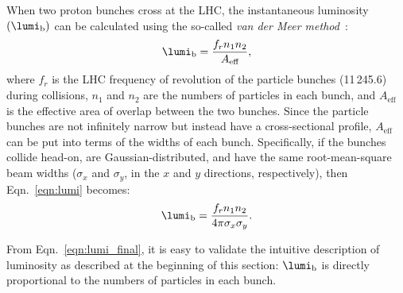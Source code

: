When two proton bunches cross at the LHC, the instantaneous luminosity $\left( \lumi_\text{b}\right)$ can be calculated using the so-called \emph{van der Meer method}~\cite{LUM_17_003}:
\begin{equation}
    \lumi_\text{b} = \frac{f_r  n_1  n_2}{A_\text{eff}},
    \label{eqn:lumi}
\end{equation}
where $f_r$ is the LHC frequency of revolution of the particle bunches (11\,245.6\Hz) during collisions,
$n_1$ and $n_2$ are the numbers of particles in each bunch,
and $A_\text{eff}$ is the effective area of overlap between the two bunches.
Since the particle bunches are not infinitely narrow but instead have a cross-sectional profile, $A_\text{eff}$ can be put into terms of the widths of each bunch.
Specifically, if the bunches collide head-on, are Gaussian-distributed, and have the same root-mean-square beam widths ($\sigma_x$ and $\sigma_y$, in the $x$ and $y$ directions, respectively), then Eqn.~\ref{eqn:lumi} becomes:
\begin{equation}
    \lumi_\text{b} = \frac{f_r  n_1  n_2}{4\pi \sigma_x \sigma_y}.
    \label{eqn:lumi_final}
\end{equation}

From Eqn.~\ref{eqn:lumi_final}, it is easy to validate the intuitive description of luminosity as described at the beginning of this section:
$\lumi_\text{b}$ is directly proportional to the numbers of particles in each bunch.












